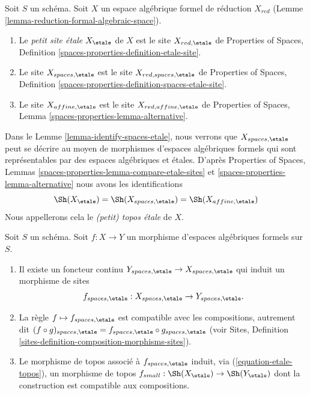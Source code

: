 \begin{definition}
\label{definition-etale-sites}
Soit $S$ un schéma. Soit $X$ un espace algébrique formel de
réduction $X_{red}$ (Lemme \ref{lemma-reduction-formal-algebraic-space}).
\begin{enumerate}
\item Le {\it petit site \'etale} $X_\etale$ de $X$ est
le site $X_{red, \etale}$ de Properties of Spaces, Definition
\ref{spaces-properties-definition-etale-site}.
\item Le site $X_{spaces, \etale}$ est le site
$X_{red, spaces, \etale}$ de Properties of Spaces, Definition
\ref{spaces-properties-definition-spaces-etale-site}.
\item Le site $X_{affine, \etale}$ est le site
$X_{red, affine, \etale}$ de Properties of Spaces, Lemma
\ref{spaces-properties-lemma-alternative}.
\end{enumerate}
\end{definition}

\noindent
Dans le Lemme \ref{lemma-identify-spaces-etale}, nous verrons que
$X_{spaces, \etale}$ peut se décrire au moyen de
morphismes d'espaces algébriques formels qui sont représentables
par des espaces algébriques et \'etales.
D'après Properties of Spaces, Lemmas
\ref{spaces-properties-lemma-compare-etale-sites} et
\ref{spaces-properties-lemma-alternative}
nous avons les identifications
\begin{equation}
\label{equation-etale-topos}
\Sh(X_\etale) = \Sh(X_{spaces, \etale}) = \Sh(X_{affine, \etale})
\end{equation}
Nous appellerons cela le {\it (petit) topos \'etale} de $X$.

\begin{lemma}
\label{lemma-functoriality-etale-site}
Soit $S$ un schéma.
Soit $f : X \to Y$ un morphisme d'espaces algébriques formels sur $S$.
\begin{enumerate}
\item Il existe un foncteur continu
$Y_{spaces, \etale} \to X_{spaces, \etale}$
qui induit un morphisme de sites
$$
f_{spaces, \etale} : X_{spaces, \etale} \to Y_{spaces, \etale}.
$$
\item La règle $f \mapsto f_{spaces, \etale}$ est compatible avec les
compositions, autrement dit $(f \circ g)_{spaces, \etale}
= f_{spaces, \etale} \circ g_{spaces, \etale}$ (voir
Sites, Definition \ref{sites-definition-composition-morphisms-sites}).
\item Le morphisme de topos associé à $f_{spaces, \etale}$
induit, via (\ref{equation-etale-topos}), un morphisme de topos
$f_{small} : \Sh(X_\etale) \to \Sh(Y_\etale)$
dont la construction est compatible aux compositions.
\end{enumerate}
\end{lemma}

